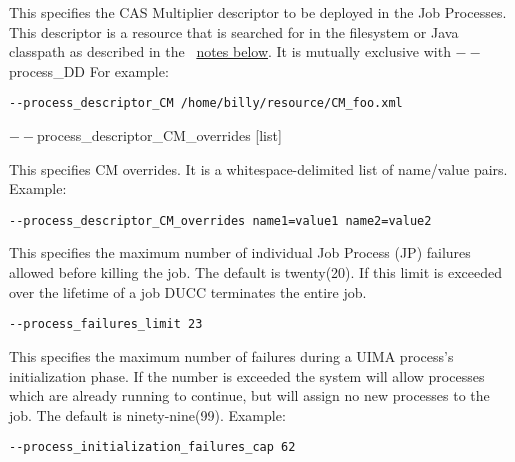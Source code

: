 \begin{description}
           \item[$--$process\_descriptor\_CM {[descriptor]} ]

             This specifies the CAS Multiplier descriptor to be deployed in the Job Processes. This 
             descriptor is a resource that is searched for in the filesystem or Java classpath as described 
             in the ~\hyperref[par:cli.submit.notes]{notes below}.
             It is mutually exclusive with $--$process\_DD For example: 
             \begin{verbatim}             
--process_descriptor_CM /home/billy/resource/CM_foo.xml 
             \end{verbatim}

           \begin{sloppypar}             
           \item[$--$process\_descriptor\_CM\_overrides {[list]}  ]

             This specifies CM overrides. It is a whitespace-delimited list of name/value pairs. Example: 
\begin{verbatim}
--process_descriptor_CM_overrides name1=value1 name2=value2 
\end{verbatim}
           \end{sloppypar}
           
           \item[$--$process\_failures\_limit {[integer]} ]

             This specifies the maximum number of individual Job Process (JP) failures allowed
             before killing the job. The default is twenty(20). If this limit is exceeded over the lifetime 
             of a job DUCC terminates the entire job. 
             \begin{verbatim}
--process_failures_limit 23
\end{verbatim}
                          
           \item[$--$process\_initialization\_failures\_cap {[integer]} ] This specifies the maximum
             number of failures during a UIMA process's initialization phase.  If the number is
             exceeded the system will allow processes which are already running to continue, but
             will assign no new processes to the job.  The default is ninety-nine(99). Example:
             \begin{verbatim}
--process_initialization_failures_cap 62 
             \end{verbatim}
             

\end{description}
